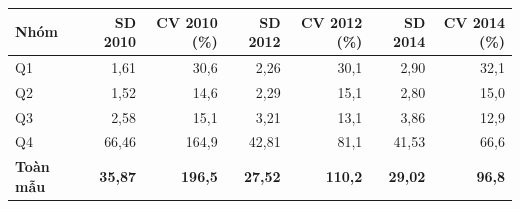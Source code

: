 \begin{tabular}{lrrrrrr}
\toprule
Nhóm & SD 2010 & CV 2010 (\%) & SD 2012 & CV 2012 (\%) & SD 2014 & CV 2014 (\%) \\
\midrule
Q1 & 1,61 & 30,6 & 2,26 & 30,1 & 2,90 & 32,1 \\
Q2 & 1,52 & 14,6 & 2,29 & 15,1 & 2,80 & 15,0 \\
Q3 & 2,58 & 15,1 & 3,21 & 13,1 & 3,86 & 12,9 \\
Q4 & 66,46 & 164,9 & 42,81 & 81,1 & 41,53 & 66,6 \\
\textbf{Toàn mẫu} & \textbf{35,87} & \textbf{196,5} & \textbf{27,52} & \textbf{110,2} & \textbf{29,02} & \textbf{96,8} \\
\bottomrule
\end{tabular}
